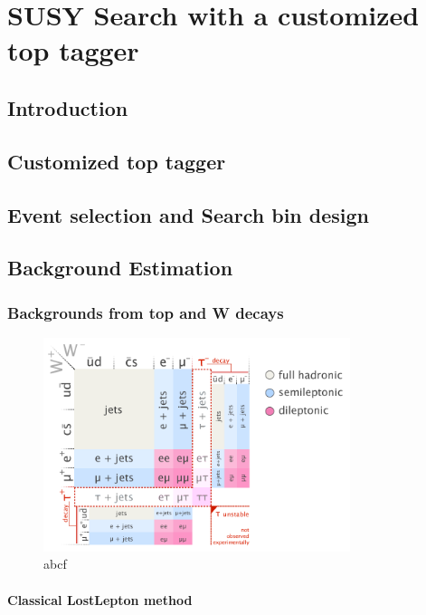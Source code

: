 \chapter{SUSY Search with a customized top tagger}
\section{Introduction}
\label{sec:c4intro}


\section{Customized top tagger}

\section{Event selection and Search bin design}

\section{Background Estimation}

\subsection{Backgrounds from top and W decays}
\begin{figure}[htbp]
 \begin{center}
  \includegraphics[width=0.8\textwidth]{figures/c4/c4_top_w_decaymod.png}
 \end{center}
 \caption{abcf}
 \label{fig:c4twdecaymod}
\end{figure}

\subsubsection{Classical LostLepton method}
